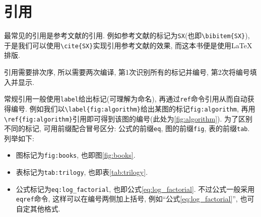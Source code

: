 \chapter{引用}
\label{chapter_ref}

最常见的引用是参考文献的引用. 例如参考文献\cite{SX}的标记为\verb=SX=(也即\verb=\bibitem{SX}=), 
于是我们可以使用\verb=\cite{SX}=实现引用参考文献\cite{SX}的效果, 
而这本书便是使用\LaTeX{}排版. 

引用需要排次序, 所以需要两次编译, 第1次识别所有的标记并编号, 第2次将编号填入并显示. 

常规引用一般使用\verb=label=给出标记(可理解为命名), 再通过\verb=ref=命令引用从而自动获得编号. 
例如我们以\verb=\label{fig:algorithm}=给出某图的标记\verb=fig:algorithm=, 
再用\verb=\ref{fig:algorithm}=引用即可得到该图的编号(此处为\ref{fig:algorithm}). 
为了区别不同的标记, 可用前缀配合冒号区分: 公式的前缀\verb=eq=, 图的前缀\verb=fig=, 表的前缀\verb=tab=.
列举如下:
\begin{itemize}
    \item 图标记为\verb=fig:books=, 也即图\ref{fig:books}.
    \item 表标记为\verb=tab:trilogy=, 也即表\ref{tab:trilogy}.
    \item 公式标记为\verb=eq:log_factorial=, 也即公式\ref{eq:log_factorial}. 不过公式一般采用\texttt{eqref}命令, 这样可以在编号两侧加上括号, 例如``公式\eqref{eq:log_factorial}'', 也可自定其他格式.

\end{itemize}
